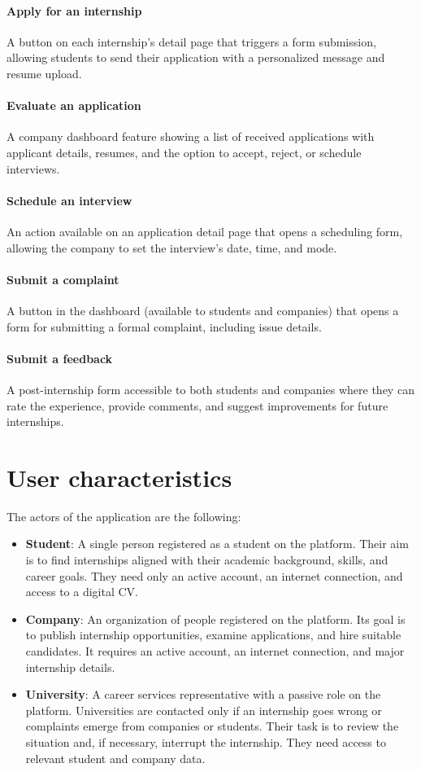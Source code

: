 \paragraph{Apply for an internship}A button on each internship's detail page that triggers a form submission, allowing students to send their application with a personalized message and resume upload.
\paragraph{Evaluate an application}A company dashboard feature showing a list of received applications with applicant details, resumes, and the option to accept, reject, or schedule interviews.
\paragraph{Schedule an interview}An action available on an application detail page that opens a scheduling form, allowing the company to set the interview's date, time, and mode.
\paragraph{Submit a complaint}A button in the dashboard (available to students and companies) that opens a form for submitting a formal complaint, including issue details.
\paragraph{Submit a feedback}A post-internship form accessible to both students and companies where they can rate the experience, provide comments, and suggest improvements for future internships.

\section{User characteristics}
\label{sec:user_characteristics}%

The actors of the application are the following:

\begin{itemize}
    \item \textbf{Student}: A single person registered as a student on the platform. Their aim is to find internships aligned with their academic background, skills, and career goals. They need only an active account, an internet connection, and access to a digital CV.
    \item \textbf{Company}: An organization of people registered on the platform. Its goal is to publish internship opportunities, examine applications, and hire suitable candidates. It requires an active account, an internet connection, and major internship details.
    \item \textbf{University}: A career services representative with a passive role on the platform. Universities are contacted only if an internship goes wrong or complaints emerge from companies or students. Their task is to review the situation and, if necessary, interrupt the internship. They need access to relevant student and company data.
\end{itemize}


